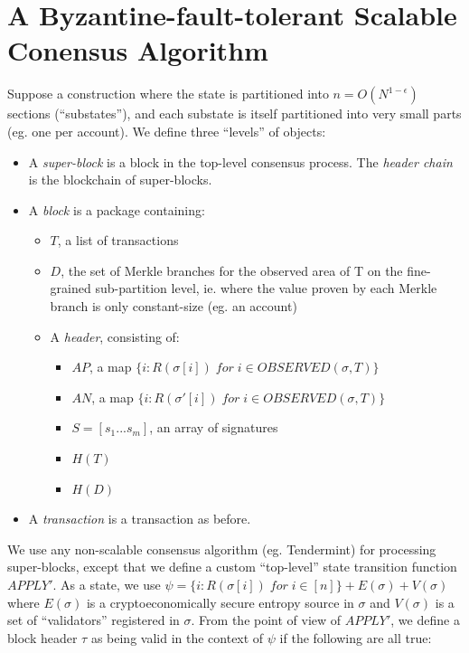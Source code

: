 \documentclass[11pt,a4paper]{report}
\theoremstyle{plain}
\theoremstyle{definition}
\theoremstyle{remark}
\begin{document}
\chapter{A Byzantine-fault-tolerant Scalable Conensus Algorithm}

Suppose a construction where the state is partitioned into $n = O(N^{1-\epsilon})$ sections (``substates''), and each substate is itself partitioned into very small parts (eg. one per account). We define three ``levels'' of objects:

\begin{itemize}
\item
A \emph{super-block} is a block in the top-level consensus process. The \emph{header chain} is the blockchain of super-blocks.
\item
A \emph{block} is a package containing:

    \begin{itemize}
    \item
    $T$, a list of transactions
    \item
    $D$, the set of Merkle branches for the observed area of T on the fine-grained sub-partition level, ie. where the value proven by each Merkle branch is only constant-size (eg. an account)
    \item
    A \emph{header}, consisting of:
        \begin{itemize}
        \item
        $AP$, a map $\{i: R(\sigma[i]) \; for \; i \in OBSERVED(\sigma, T)\}$
        \item
        $AN$, a map $\{i: R(\sigma'[i]) \; for \; i \in OBSERVED(\sigma, T)\}$
        \item
        $S = [s_1 ... s_m]$, an array of signatures
        \item
        $H(T)$
        \item
        $H(D)$
        \end{itemize}
    \end{itemize}
\item
A \emph{transaction} is a transaction as before.
\end{itemize}

We use any non-scalable consensus algorithm (eg. Tendermint) for processing super-blocks, except that we define a custom ``top-level'' state transition function $APPLY'$. As a state, we use $\psi = \{i: R(\sigma[i]) \; for \; i \in [n]\} + E(\sigma) + V(\sigma)$ where $E(\sigma)$ is a cryptoeconomically secure entropy source in $\sigma$ and $V(\sigma)$ is a set of ``validators'' registered in $\sigma$. From the point of view of $APPLY'$, we define a block header $\tau$ as being valid in the context of $\psi$ if the following are all true:
\end{document}
